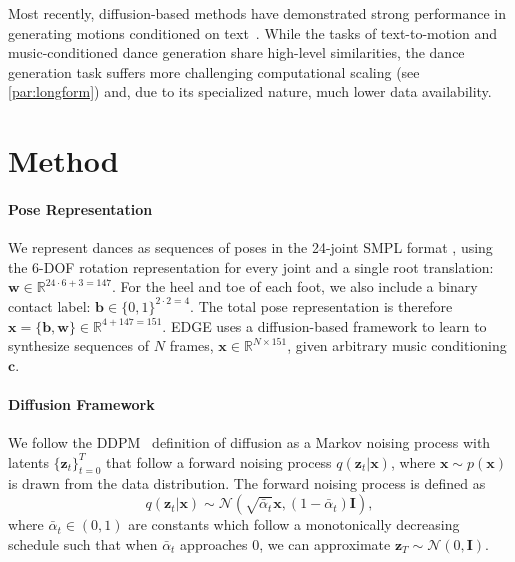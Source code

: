 \documentclass[10pt,twocolumn,letterpaper]{article}
\begin{document}
Most recently, diffusion-based methods have demonstrated strong performance in generating motions conditioned on text~\cite{tevet2022human,zhang2022motiondiffuse,kim2022flame}.
While the tasks of text-to-motion and music-conditioned dance generation share high-level similarities, the dance generation task suffers more challenging computational scaling (see \cref{par:longform}) and, due to its specialized nature, much lower data availability.

\section{Method} \label{sec:method}

\paragraph{Pose Representation}
 We represent dances as sequences of poses in the 24-joint SMPL format \cite{loper2015smpl}, using the 6-DOF rotation representation \cite{zhou2019continuity} for every joint and a single root translation: $\bm{w} \in \mathbb{R}^{24 \cdot 6 + 3 = 147}$. For the heel and toe of each foot, we also include a binary contact label: $\bm{b} \in \{0,1\}^{2 \cdot 2 = 4}$. The total pose representation is therefore $\bm{x} = \{\bm{b} , \bm{w}\} \in \mathbb{R}^{4+147=151}.$
EDGE uses a diffusion-based framework to learn to synthesize sequences of $N$ frames, $\bm{x} \in \mathbb{R}^{N\times 151}$, given arbitrary music conditioning $\bm{c}$.

\paragraph{Diffusion Framework}
We follow the DDPM~\cite{ho2020denoising} definition of diffusion as a Markov noising process with latents $\{\bm{z}_t\}_{t=0}^T$ that follow a forward noising process $q(\bm{z}_t | \bm{x})$, where $\bm{x} \sim p(\bm{x})$ is drawn from the data distribution.
The forward noising process is defined as
\begin{equation} \label{eq:1}
{
q(\bm{z}_{t} | \bm{x}) \sim \mathcal{N}(\sqrt{\bar{\alpha}_{t}}\bm{x}, (1 - \bar{\alpha}_{t})\bm{I}),
}
\end{equation}
where $\bar{\alpha}_{t} \in (0,1)$ are constants which follow a monotonically decreasing schedule such that when $\bar{\alpha}_{t}$ approaches 0, we can approximate $\bm{z}_{T} \sim \mathcal{N}(0,\bm{I})$.
\end{document}
